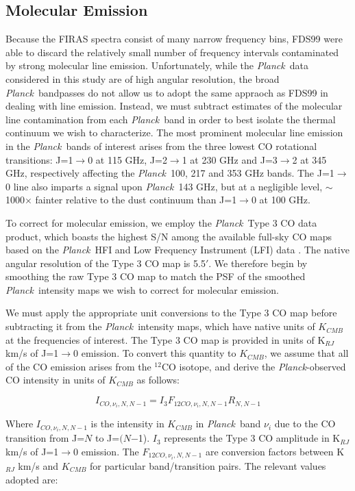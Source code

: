 \documentclass{emulateapj}
\newcommand{\PLANCK}{{\it Planck}}
\begin{document}
\subsection{Molecular Emission}
Because the FIRAS spectra consist of many narrow frequency bins, FDS99 were
able to discard the relatively small number of frequency intervals contaminated
by strong molecular line emission. Unfortunately, while the \PLANCK~data 
considered in this study are of high angular resolution, the broad 
\PLANCK~bandpasses do not allow us to adopt the same appraoch as FDS99 in 
dealing with line emission. Instead, we must subtract estimates of the 
molecular line contamination from each \PLANCK~band in order to best isolate 
the thermal continuum we wish to characterize. The most prominent molecular 
line emission in the \PLANCK~bands of interest arises from the three lowest CO 
rotational transitions: J=1$\rightarrow$0 at 115 GHz, J=2$\rightarrow$1 at 230 
GHz and J=3$\rightarrow$2 at 345 GHz, respectively affecting the \PLANCK~100, 
217 and 353 GHz bands. The J=1$\rightarrow$0 line also imparts a signal upon 
\PLANCK~143 GHz, but at a negligible level, $\sim$1000$\times$ fainter relative
to the dust continuum than J=1$\rightarrow$0 at 100 GHz.

To correct for molecular emission, we employ the \PLANCK~Type 3 CO data 
product, which boasts the highest S/N among the available full-sky CO maps 
based on the \PLANCK~HFI and Low Frequency Instrument (LFI) data 
\citep{planckco}. The native angular resolution of the Type 3 CO map is 5.5$'$.
We therefore begin by smoothing the raw Type 3 CO map to match the PSF of the 
smoothed \PLANCK~intensity maps we wish to correct for molecular emission.

We must apply the appropriate unit conversions to the Type 3 CO map before 
subtracting it from the \PLANCK~intensity maps, which have native units of 
$K_{CMB}$ at the frequencies of interest. The Type 3 CO map is provided in 
units of K$_{RJ}$ km/s of J=1$\rightarrow$0 emission. To convert this quantity 
to $K_{CMB}$, we assume that all of the CO emission arises from the $^{12}$CO 
isotope, and derive the \PLANCK-observed CO intensity in units of $K_{CMB}$ as
follows:

\begin{equation}
I_{CO, \nu_i, N, N-1} = I_{3}F_{12CO, \nu_i, N, N-1} R_{N, N-1}
\end{equation}

Where $I_{CO, \nu_i, N, N-1}$ is the intensity in $K_{CMB}$ in \PLANCK~band 
$\nu_i$ due to the CO transition from J=$N$ to J=$(N$$-$1). $I_3$ represents 
the Type 3 CO amplitude in  K$_{RJ}$ km/s of J=1$\rightarrow$0 emission. The 
$F_{12CO, \nu_i, N, N-1}$ are conversion factors between K$_{RJ}$ km/s and 
$K_{CMB}$ for particular band/transition pairs. The relevant values adopted 
are:
\end{document}
